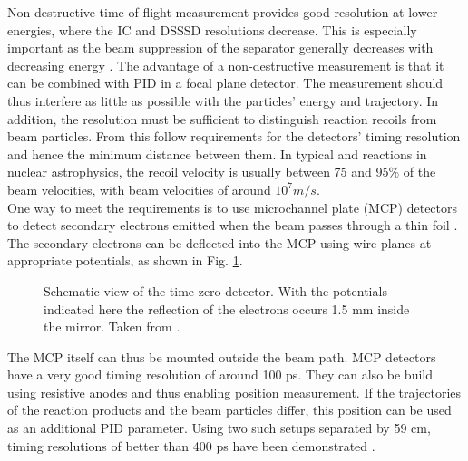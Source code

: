 Non-destructive time-of-flight measurement provides good resolution at lower energies, where the IC and DSSSD resolutions decrease. This is especially important as the beam suppression of the separator generally decreases with decreasing energy \cite{hutc08}. The advantage of a non-destructive measurement is that it can be combined with PID in a focal plane detector. The measurement should thus interfere as little as possible with the particles' energy and trajectory. In addition, the resolution must be sufficient to distinguish reaction recoils from beam particles. From this follow requirements for the detectors' timing resolution and hence the minimum distance between them. In typical  and \reac{\alpha}{\gamma} reactions in nuclear astrophysics, the recoil velocity is usually between 75 and 95\% of the beam velocities, with beam velocities of around $10^7 \unit{m/s}$.   \\
One way to meet the requirements is to use microchannel plate (MCP) detectors to detect secondary electrons emitted when the beam passes through a thin foil \cite{star82}. The secondary electrons can be deflected into the MCP using wire planes at appropriate potentials, as shown in Fig. \ref{fig:Starzecki82_Fig1}.
%
\begin{figure}
\centering
{}
\caption{Schematic view of the time-zero detector. With the potentials indicated here the reflection of the electrons occurs 1.5 mm inside the mirror. Taken from \cite{star82}.}
\label{fig:Starzecki82_Fig1}
\end{figure}%
%
The MCP itself can thus be mounted outside the beam path. MCP detectors have a very good timing resolution of around 100 ps. They can also be build using resistive anodes and thus enabling position measurement. If the trajectories of the reaction products and the beam particles differ, this position can be used as an additional PID parameter. Using two such setups separated by 59 cm, timing resolutions of better than 400 ps have been demonstrated \cite{vock09}. \\
